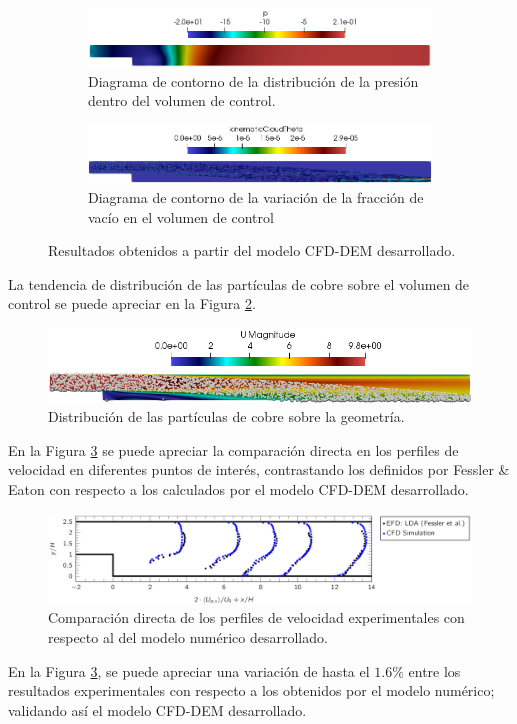 \begin{figure}[h!]
	\centering
	\begin{subfigure}[b]{\textwidth}
		\centering
		\includegraphics[width=\textwidth]{Images/valp.png}
		\caption{Diagrama de contorno de la distribuci\'on de la presi\'on dentro del volumen de control.}
	\end{subfigure}
	\hfill
	\begin{subfigure}[b]{\textwidth}
		\centering
		\includegraphics[width=\textwidth]{Images/valk.png}
		\caption{Diagrama de contorno de la variaci\'on de la fracci\'on de vac\'io en el volumen de control}
	\end{subfigure}
	\caption{Resultados obtenidos a partir del modelo CFD-DEM desarrollado.}
	\label{valrel}
\end{figure}

\noindent
\justify

La tendencia de distribuci\'on de las part\'iculas de cobre sobre el volumen de control se puede apreciar en la Figura \ref{valten}.

\begin{figure}[h!]
	\centering
	\includegraphics[width=1.1\textwidth]{Images/valpar.png}
	\caption{Distribuci\'on de las part\'iculas de cobre sobre la geometr\'ia.}
	\label{valten}
\end{figure}

\noindent
\justify

En la Figura \ref{valcompa} se puede apreciar la comparaci\'on directa en los perfiles de velocidad en diferentes puntos de inter\'es, contrastando los definidos por Fessler \& Eaton con respecto a los calculados por el modelo CFD-DEM desarrollado.

\begin{figure}[h!]
	\centering
	\includegraphics[width=1.1\textwidth]{Images/val.png}
	\caption{Comparaci\'on directa de los perfiles de velocidad experimentales con respecto al del modelo num\'erico desarrollado.}
	\label{valcompa}
\end{figure}

\noindent
\justify

En la Figura \ref{valcompa}, se puede apreciar una variaci\'on de hasta el $1.6\%$  entre los resultados experimentales con respecto a los obtenidos por el modelo num\'erico; validando as\'i el modelo CFD-DEM desarrollado.
